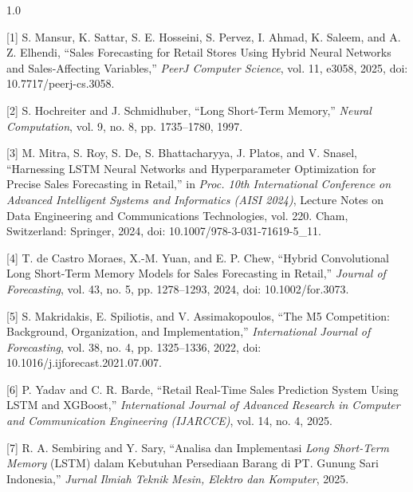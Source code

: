 \documentclass[12pt, a4paper, onecolumn, oneside]{report}
\begin{document}
\vspace{0.5cm}
\begin{spacing}{1.0}

\noindent\hangindent=1.5cm
{[1]} S. Mansur, K. Sattar, S. E. Hosseini, S. Pervez, I. Ahmad, K. Saleem, and A. Z. Elhendi, ``Sales Forecasting for Retail Stores Using Hybrid Neural Networks and Sales-Affecting Variables,'' \textit{PeerJ Computer Science}, vol. 11, e3058, 2025, doi: 10.7717/peerj-cs.3058.

\vspace{0.3cm}
\noindent\hangindent=1.5cm
{[2]} S. Hochreiter and J. Schmidhuber, ``Long Short-Term Memory,'' \textit{Neural Computation}, vol. 9, no. 8, pp. 1735--1780, 1997.

\vspace{0.3cm}
\noindent\hangindent=1.5cm
{[3]} M. Mitra, S. Roy, S. De, S. Bhattacharyya, J. Platos, and V. Snasel, ``Harnessing LSTM Neural Networks and Hyperparameter Optimization for Precise Sales Forecasting in Retail,'' in \textit{Proc. 10th International Conference on Advanced Intelligent Systems and Informatics (AISI 2024)}, Lecture Notes on Data Engineering and Communications Technologies, vol. 220. Cham, Switzerland: Springer, 2024, doi: 10.1007/978-3-031-71619-5\_11.

\vspace{0.3cm}
\noindent\hangindent=1.5cm
{[4]} T. de Castro Moraes, X.-M. Yuan, and E. P. Chew, ``Hybrid Convolutional Long Short-Term Memory Models for Sales Forecasting in Retail,'' \textit{Journal of Forecasting}, vol. 43, no. 5, pp. 1278--1293, 2024, doi: 10.1002/for.3073.

\vspace{0.3cm}
\noindent\hangindent=1.5cm
{[5]} S. Makridakis, E. Spiliotis, and V. Assimakopoulos, ``The M5 Competition: Background, Organization, and Implementation,'' \textit{International Journal of Forecasting}, vol. 38, no. 4, pp. 1325--1336, 2022, doi: 10.1016/j.ijforecast.2021.07.007.

\vspace{0.3cm}
\noindent\hangindent=1.5cm
{[6]} P. Yadav and C. R. Barde, ``Retail Real-Time Sales Prediction System Using LSTM and XGBoost,'' \textit{International Journal of Advanced Research in Computer and Communication Engineering (IJARCCE)}, vol. 14, no. 4, 2025.

\vspace{0.3cm}
\noindent\hangindent=1.5cm
{[7]} R. A. Sembiring and Y. Sary, ``Analisa dan Implementasi \textit{Long Short-Term Memory} (LSTM) dalam Kebutuhan Persediaan Barang di PT. Gunung Sari Indonesia,'' \textit{Jurnal Ilmiah Teknik Mesin, Elektro dan Komputer}, 2025.


\end{spacing}
\end{document}
